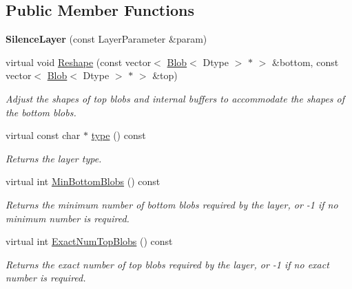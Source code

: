 \subsection*{Public Member Functions}
\begin{DoxyCompactItemize}
\item 
{\bfseries Silence\+Layer} (const Layer\+Parameter \&param)\hypertarget{classcaffe_1_1SilenceLayer_a78a184081ba10fef4d0e639eab86122b}{}\label{classcaffe_1_1SilenceLayer_a78a184081ba10fef4d0e639eab86122b}

\item 
virtual void \hyperlink{classcaffe_1_1SilenceLayer_a764bbaf5d9e632594a6b22863244e790}{Reshape} (const vector$<$ \hyperlink{classcaffe_1_1Blob}{Blob}$<$ Dtype $>$ $\ast$ $>$ \&bottom, const vector$<$ \hyperlink{classcaffe_1_1Blob}{Blob}$<$ Dtype $>$ $\ast$ $>$ \&top)
\begin{DoxyCompactList}\small\item\em Adjust the shapes of top blobs and internal buffers to accommodate the shapes of the bottom blobs. \end{DoxyCompactList}\item 
virtual const char $\ast$ \hyperlink{classcaffe_1_1SilenceLayer_a4a490206e6c23fe1d397fd6c722a6cf2}{type} () const \hypertarget{classcaffe_1_1SilenceLayer_a4a490206e6c23fe1d397fd6c722a6cf2}{}\label{classcaffe_1_1SilenceLayer_a4a490206e6c23fe1d397fd6c722a6cf2}

\begin{DoxyCompactList}\small\item\em Returns the layer type. \end{DoxyCompactList}\item 
virtual int \hyperlink{classcaffe_1_1SilenceLayer_a0173d01d6408027cba41f5a8391e3d40}{Min\+Bottom\+Blobs} () const 
\begin{DoxyCompactList}\small\item\em Returns the minimum number of bottom blobs required by the layer, or -\/1 if no minimum number is required. \end{DoxyCompactList}\item 
virtual int \hyperlink{classcaffe_1_1SilenceLayer_a9bea0b5a6e1c15eefc85fdcc58d1c2e7}{Exact\+Num\+Top\+Blobs} () const 
\begin{DoxyCompactList}\small\item\em Returns the exact number of top blobs required by the layer, or -\/1 if no exact number is required. \end{DoxyCompactList}\end{DoxyCompactItemize}
